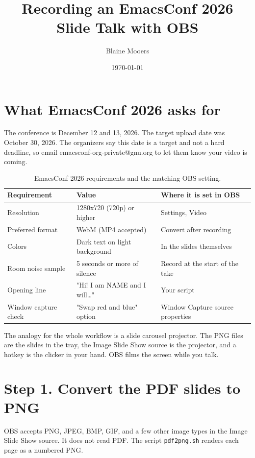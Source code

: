 \documentclass[11pt]{article}
\author{Blaine Mooers}
\date{\today}
\title{Recording an EmacsConf 2026 Slide Talk with OBS}
\begin{document}
\maketitle
\section*{What EmacsConf 2026 asks for}
\label{sec:org3cd9614}

The conference is December 12 and 13, 2026. The target upload date was October 30, 2026. The organizers say this date is a target and not a hard deadline, so email emacsconf-org-private@gnu.org to let them know your video is coming.

\begin{table}[htbp]
\caption{EmacsConf 2026 requirements and the matching OBS setting.}
\centering
\begin{tabular}{lll}
\toprule
Requirement & Value & Where it is set in OBS\\
\midrule
Resolution & 1280x720 (720p) or higher & Settings, Video\\
Preferred format & WebM (MP4 accepted) & Convert after recording\\
Colors & Dark text on light background & In the slides themselves\\
Room noise sample & 5 seconds or more of silence & Record at the start of the take\\
Opening line & "Hi! I am NAME and I will\ldots{}" & Your script\\
Window capture check & "Swap red and blue" option & Window Capture source properties\\
\bottomrule
\end{tabular}
\end{table}

The analogy for the whole workflow is a slide carousel projector. The PNG files are the slides in the tray, the Image Slide Show source is the projector, and a hotkey is the clicker in your hand. OBS films the screen while you talk.
\section*{Step 1. Convert the PDF slides to PNG}
\label{sec:orga37724e}

OBS accepts PNG, JPEG, BMP, GIF, and a few other image types in the Image Slide Show source. It does not read PDF. The script \texttt{pdf2png.sh} renders each page as a numbered PNG.
\end{document}
